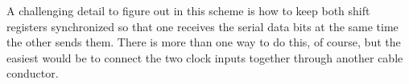 A challenging detail to figure out in this scheme is how to keep both shift registers synchronized so that one receives the serial data bits at the same time the other sends them.  There is more than one way to do this, of course, but the easiest would be to connect the two clock inputs together through another cable conductor.




